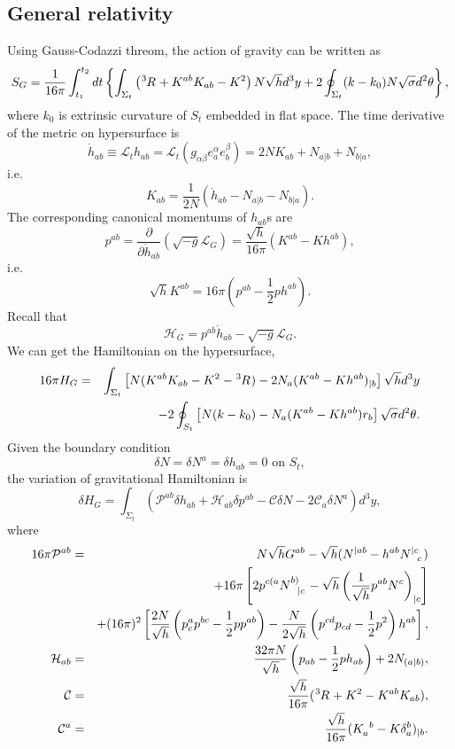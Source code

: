 \subsection{General relativity}
Using Gauss-Codazzi threom, the action of gravity can be written as
\[S_G = \frac{1}{16 \pi} \int_{t_1}^{t_2} dt \left\{ \int_{\Sigma_t} \left(\tensor[^3]{R}{} + K^{ab}K_{ab} -K^2 \right) N \sqrt{h} d^3 y + 2\oint_{\Sigma_t}(k-k_0)N \sqrt{\sigma}d^2 \theta \right\} ,\]
where $k_0$ is extrinsic curvature of $S_t$ embedded in flat space. 
The time derivative of the metric on hypersurface is
\[\dot{h}_{ab} \equiv \mathscr{L}_t h_{ab} = \mathscr{L}_t (g_{\alpha \beta} e_a^{\alpha} e_b^{\beta}) =  2NK_{ab} + N_{a|b} + N_{b|a},\]
i.e.
\[K_{ab} = \frac{1}{2N} (\dot{h}_{ab} - N_{a|b} - N_{b|a}).\]
The corresponding canonical momentums of $h_{ab}$s are  
\[p^{ab} = \frac{\partial}{\partial \dot{h}_{ab}} (\sqrt{-g} \mathcal{L}_G) = \frac{\sqrt{h}}{16\pi} (K^{ab} - K h^{ab}),\]
i.e.
\[\sqrt{h}K^{ab} = 16\pi \left(p^{ab} - \frac{1}{2}ph^{ab}\right).\]
Recall that
\[\mathcal{H}_G = p^{ab}\dot{h}_{ab} - \sqrt{-g} \mathcal{L}_G.\]
We can get the Hamiltonian on the hypersurface,
\begin{eqnarray}
16\pi H_G &=& \int_{\Sigma_t} \left[ N(K^{ab}K_{ab} - K^2 - \tensor[^3]{R}{}) - 2N_a(K^{ab} - Kh^{ab})_{|b} \right] \sqrt{h} d^3 y 
\nonumber \\
&\phantom{=}& -2\oint_{S_t} \left[ N(k-k_0) - N_a(K^{ab}-Kh^{ab})r_b \right] \sqrt{\sigma} d^2 \theta .\nonumber
\end{eqnarray}
Given the boundary condition
\[\delta N = \delta N^a = \delta h_{ab} = 0 \mbox{ on } S_t,\]
the variation of gravitational Hamiltonian is
\[\delta H_G = \int_{\Sigma_t} (\mathcal{P}^{ab} \delta h_{ab} + \mathcal{H}_{ab} \delta p^{ab} - \mathcal{C}\delta N - 2\mathcal{C}_a \delta N^a) d^3 y,\]
where
\begin{eqnarray}
    16\pi\mathcal{P}^{ab} &=&  N\sqrt{h}G^{ab} - \sqrt{h}(N^{|ab} - h^{ab} \tensor{N}{^{|c}_{c}}) \nonumber \\
    &\phantom{=}& +16\pi\left[2\tensor{p}{^{c(a}} \tensor{N}{^{b)}_{|c}} - \sqrt{h}\left(\frac{1}{\sqrt{h}}p^{ab}N^c
    \right)_{|c}\right] \nonumber \\
    &\phantom{=}& + (16\pi)^2 \left[\frac{2N}{\sqrt{h}} \left(p^a_c p^{bc} - \frac{1}{2} p p^{ab} \right) - \frac{N}{2\sqrt{h}}\left(p^{cd}p_{cd} - \frac{1}{2} p^2 \right)h^{ab}\right], \nonumber \\
    \mathcal{H}_{ab} &=& \frac{32\pi N}{\sqrt{h}} \left(p_{ab} - \frac{1}{2}p h_{ab}\right) + 2N_{(a|b)} ,\nonumber \\
    \mathcal{C} &=& \frac{\sqrt{h}}{16\pi} (\tensor[^3]{R}{} + K^2 - K^{ab}K_{ab}) ,\nonumber \\
    \mathcal{C}^a &=& \frac{\sqrt{h}}{16\pi} (\tensor{K}{_a^{b}} - K \delta_a^{b})_{|b}. \nonumber 
\end{eqnarray}
